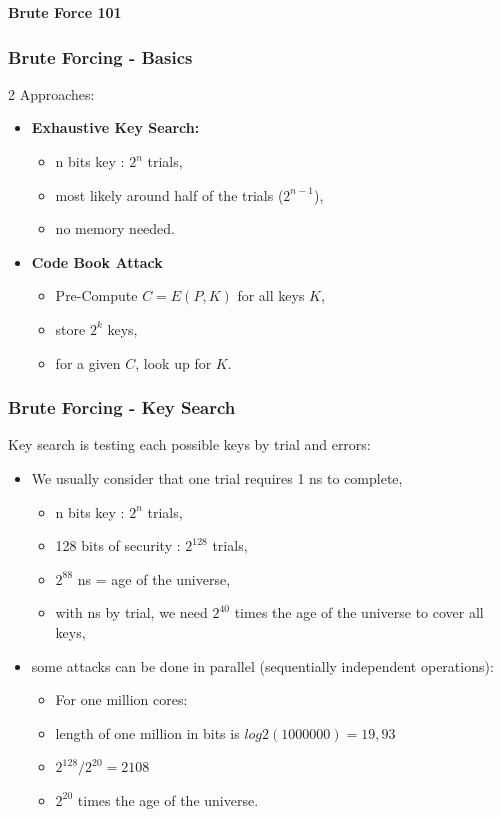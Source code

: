 \begin{frame}
  \begin{center}
    {\bf Brute Force 101}
  \end{center}
\end{frame}


\begin{frame}
        \frametitle{Brute Forcing - Basics}
        2 Approaches:
        
        \begin{itemize}
          \item {\bf Exhaustive Key Search:}
        \begin{itemize}
          \item n bits key : $2^n$ trials,
          \item most likely around half of the trials ($2^{n-1}$),
          \item no memory needed.
        \end{itemize}
          \item {\bf Code Book Attack}
        \begin{itemize}
        \item Pre-Compute $C = E(P, K)$ for all keys $K$,
        \item store $2^{k}$ keys,
        \item for a given $C$, look up for $K$.
        \end{itemize}
        \end{itemize}

\end{frame}

\begin{frame}
        \frametitle{Brute Forcing - Key Search}
        Key search is testing each possible keys by trial and errors:
        \begin{itemize}
          \item We usually consider that one trial requires 1 ns to complete,
        \begin{itemize}
          \item n bits key : $2^n$ trials,
          \item 128 bits of security : $2^{128}$ trials,
          \item $2^{88}$ ns = age of the universe,
          \item with ns by trial, we need $2^{40}$ times the age of the universe
            to cover all keys,
        \end{itemize}
          \item some attacks can be done in parallel (sequentially independent operations): 
        \begin{itemize}
          \item For one million cores:
          \item length of one million in bits is $log2(1000000) = 19,93$
          \item $2^{128}/2^{20} = 2{108}$
          \item $2^{20}$ times the age of the universe.
        \end{itemize}
        \end{itemize}
\end{frame}


